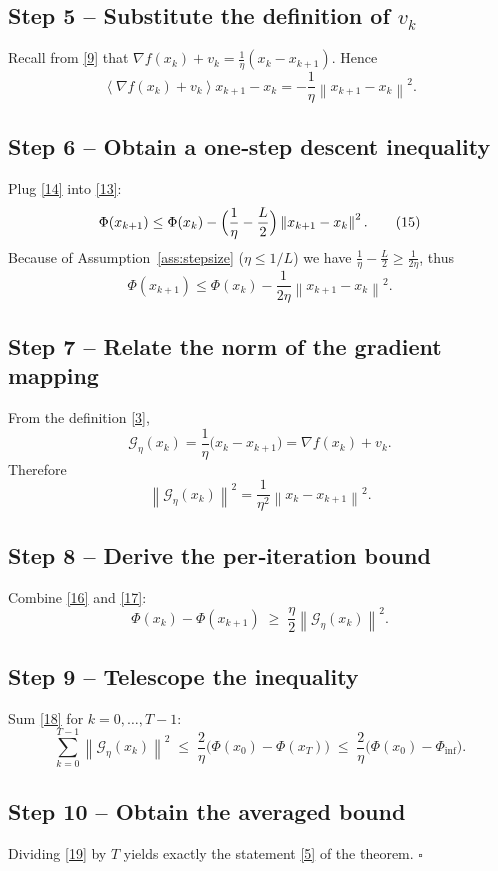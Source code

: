 \documentclass{article}
\newcommand{\norm}[1]{\left\|#1\right\|}
\newcommand{\inner}[1]{\left\langle#1\right\rangle}
\newcommand{\grad}{\nabla}
\newcommand{\G}{\mathcal{G}}
\begin{document}
\subsection*{Step 5 – Substitute the definition of $v_{k}$}
Recall from \eqref{9} that $\grad f(x_{k})+v_{k}= \frac{1}{\eta}(x_{k}-x_{k+1})$.
Hence
\[
\inner{\grad f(x_{k})+v_{k}}{x_{k+1}-x_{k}}
= -\frac{1}{\eta}\norm{x_{k+1}-x_{k}}^{2}.
\tag{14}
\]

\subsection*{Step 6 – Obtain a one‑step descent inequality}
Plug \eqref{14} into \eqref{13}:
\[
\Phi(x_{k+1})\le \Phi(x_{k})
-\Bigl(\frac{1}{\eta}-\frac{L}{2}\Bigr)\norm{x_{k+1}-x_{k}}^{2}.
\tag{15}
\]
Because of Assumption~\ref{ass:stepsize} ($\eta\le 1/L$) we have
$\frac{1}{\eta}-\frac{L}{2}\ge \frac{1}{2\eta}$, thus
\[
\Phi(x_{k+1})\le \Phi(x_{k})-\frac{1}{2\eta}\norm{x_{k+1}-x_{k}}^{2}.
\tag{16}
\]

\subsection*{Step 7 – Relate the norm of the gradient mapping}
From the definition \eqref{3},
\[
\G_{\eta}(x_{k})=\frac{1}{\eta}\bigl(x_{k}-x_{k+1}\bigr)
= \grad f(x_{k})+v_{k}.
\]
Therefore
\[
\norm{\G_{\eta}(x_{k})}^{2}
= \frac{1}{\eta^{2}}\norm{x_{k}-x_{k+1}}^{2}.
\tag{17}
\]

\subsection*{Step 8 – Derive the per‑iteration bound}
Combine \eqref{16} and \eqref{17}:
\[
\Phi(x_{k})-\Phi(x_{k+1})
\;\ge\;
\frac{\eta}{2}\norm{\G_{\eta}(x_{k})}^{2}.
\tag{18}
\]

\subsection*{Step 9 – Telescope the inequality}
Sum \eqref{18} for $k=0,\dots,T-1$:
\[
\sum_{k=0}^{T-1}\norm{\G_{\eta}(x_{k})}^{2}
\;\le\;
\frac{2}{\eta}\bigl(\Phi(x_{0})-\Phi(x_{T})\bigr)
\;\le\;
\frac{2}{\eta}\bigl(\Phi(x_{0})-\Phi_{\inf}\bigr).
\tag{19}
\]

\subsection*{Step 10 – Obtain the averaged bound}
Dividing \eqref{19} by $T$ yields exactly the statement \eqref{5} of the theorem.
\hfill $\square$
\end{document}
